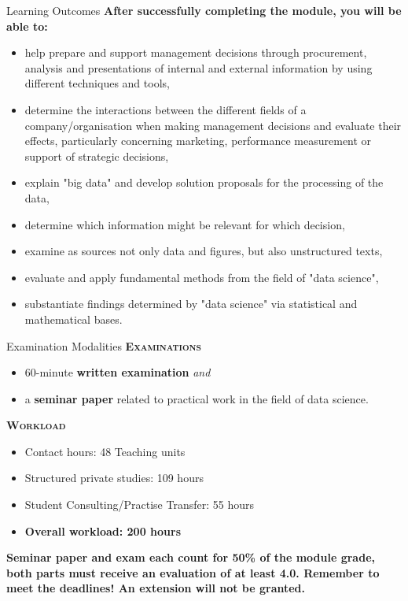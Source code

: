 \documentclass[main.tex]{subfiles}
\begin{document}
    
    \begin{frame}{Learning Outcomes}
        \textbf{After successfully completing the module, you will be able to:}
        \begin{itemize}
            \item help prepare and support management decisions through procurement, analysis and presentations of internal and external information by using different techniques and tools,
            \item determine the interactions between the different fields of a company/organisation when making management decisions and evaluate their effects, particularly concerning marketing, performance measurement or support of strategic decisions,
            \item explain "big data" and develop solution proposals for the processing of the data,
            \item determine which information might be relevant for which decision,
            \item examine as sources not only data and figures, but also unstructured texts,
            \item evaluate and apply fundamental methods from the field of "data science",
            \item substantiate findings determined by "data science" via statistical and mathematical bases.
        \end{itemize}
    \end{frame}

    \begin{frame}{Examination Modalities}
        \alert{\textbf{\textsc{Examinations}}}
        \vspace{-1mm}
        \begin{itemize}
            \item 60-minute \textbf{written examination} \textit{and}
            \item a \textbf{seminar paper} related to practical work in the field of data science.
        \end{itemize}

        \alert{\textbf{\textsc{Workload}}}
        \vspace{-1mm}
        \begin{itemize}
            \item Contact hours: 48 Teaching units
            \item Structured private studies: 109 hours
            \item Student Consulting/Practise Transfer: 55 hours
            \item \textbf{Overall workload: 200 hours}
        \end{itemize}
        	
        \textbf{Seminar paper and exam each count for 50\% of the module grade, both parts must receive an evaluation of at least 4.0. Remember to meet the deadlines! An extension will not be granted.}
    \end{frame}
\end{document}
